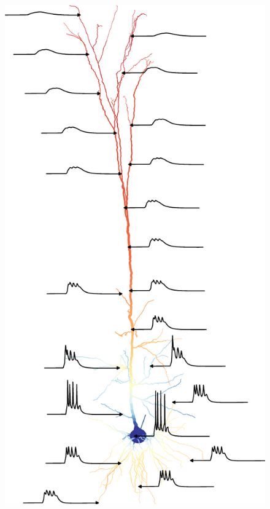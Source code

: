 \documentclass{beamer}
\begin{document}
\begin{frame}[t, fragile]
\begin{columns}
    \begin{column}{0.25\textwidth}
      \begin{figure}[h]
        \centering
        \includegraphics[width=\textwidth]{./benchmark/5a_cropped.pdf}
        \label{fig:5a}
      \end{figure}
    \end{column}
  \end{columns}


\end{frame}
\end{document}
